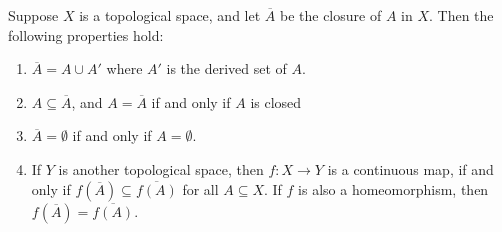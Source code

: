 \documentclass[12pt]{article}
\begin{document}
Suppose $X$ is a topological space, and let $\overline{A}$ be the 
closure of $A$ in $X$. 
Then the following properties hold:

\begin{enumerate}
\item $\overline{A}=A\cup A'$ where $A'$ is the derived set of $A$. 
\item $A\subseteq \overline{A}$, and $A=\overline{A}$ if and only if $A$
  is closed
\item $\overline{A}=\emptyset$ if and only if $A=\emptyset$. 
\item If $Y$ is another topological space, then $f\colon X \to Y$ is a continuous map,
  if and only if $f(\overline{A}) \subseteq \overline{f(A)}$ for all $A\subseteq X$. If $f$ is also a homeomorphism,
  then $f(\overline{A}) = \overline{f(A)}$.
\end{enumerate}
\end{document}
